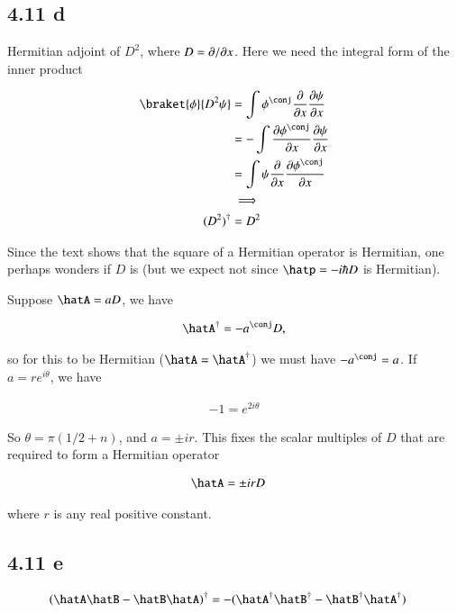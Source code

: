 \subsection{4.11 d}

Hermitian adjoint of $D^2$, where $D = {\partial {}}/{\partial {x}}$.  Here we need the integral form of the inner product

\begin{align*}
\braket{\phi}{D^2 \psi} 
&=
\int \phi^\conj \PD{x}{}\PD{x}{\psi} \\
&=
-\int \PD{x}{\phi^\conj} \PD{x}{\psi} \\
&=
\int \psi \PD{x}{}\PD{x}{\phi^\conj} \\
&\implies \\
(D^2)^\dagger &= D^2
\end{align*}

Since the text shows that the square of a Hermitian operator is Hermitian, one perhaps wonders if $D$ is (but we expect not since $\hatp = -i \hbar D$ is Hermitian).

Suppose $\hatA = aD$, we have 

\begin{align*}
\hatA^\dagger = -a^\conj D,
\end{align*}

so for this to be Hermitian ($\hatA = \hatA^\dagger$) we must have $- a^\conj = a$.  If $a = r e^{i\theta}$, we have

\begin{align*}
-1 = e^{2 i\theta}
\end{align*}

So $\theta = \pi (1/2 + n)$, and $a = \pm i r$.  This fixes the scalar multiples of $D$ that are required to form a Hermitian operator

\begin{align*}
\hatA &= \pm i r D
\end{align*}

where $r$ is any real positive constant.

\subsection{4.11 e}

\begin{align*}
(\hatA \hatB - \hatB \hatA)^\dagger &= - (\hatA^\dagger \hatB^\dagger - \hatB^\dagger \hatA^\dagger)
\end{align*}

